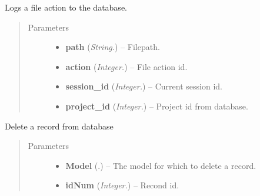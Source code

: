 \documentclass[letterpaper,10pt,english]{sphinxmanual}
\begin{document}
\begin{fulllineitems}
\label{controller:controller.CreateFileaction}
Logs a file action to the database.
\begin{quote}\begin{description}
\item[{Parameters}] \leavevmode\begin{itemize}
\item {} 
\textbf{path} (\emph{String.}) -- Filepath.

\item {} 
\textbf{action} (\emph{Integer.}) -- File action id.

\item {} 
\textbf{session\_id} (\emph{Integer.}) -- Current session id.

\item {} 
\textbf{project\_id} (\emph{Integer.}) -- Project id from database.

\end{itemize}

\end{description}\end{quote}

\end{fulllineitems}


\begin{fulllineitems}
\label{controller:controller.DeleteRecord}
Delete a record from database
\begin{quote}\begin{description}
\item[{Parameters}] \leavevmode\begin{itemize}
\item {} 
\textbf{Model} (.) -- The model for which to delete a record.

\item {} 
\textbf{idNum} (\emph{Integer.}) -- Recond id.

\end{itemize}

\end{description}\end{quote}

\end{fulllineitems}
\end{document}

